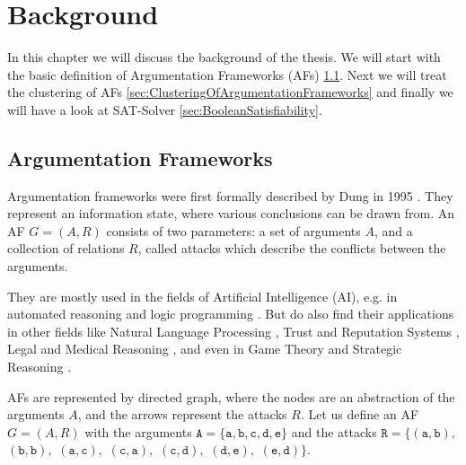 \chapter{Background}
In this chapter we will discuss the background of the thesis. We will start with the basic definition of Argumentation Frameworks (AFs) \ref{sec:ArgumentationFrameworks}. Next we will treat the clustering of AFs \ref{sec:ClusteringOfArgumentationFrameworks} and finally we will have a look at SAT-Solver \ref{sec:BooleanSatisfiability}.


\section{Argumentation Frameworks}
\label{sec:ArgumentationFrameworks}

Argumentation frameworks were first formally described by Dung in 1995 \cite{DUNG1995321}. They represent an information state, where various conclusions can be drawn from. An AF $G = (A, R)$ consists of two parameters: a set of arguments $A$, and a collection of relations $R$, called attacks which describe the conflicts between the arguments.

They are mostly used in the fields of Artificial Intelligence (AI), e.g. in automated reasoning and logic programming \cite{AFINAIARLP, AFINAIARLPexample}. But do also find their applications in other fields like Natural Language Processing \cite{AFINNLP}, Trust and Reputation Systems \cite{AFINTaRS}, Legal and Medical Reasoning \cite{legalAndMedicalReasoning}, and even in Game Theory and Strategic Reasoning \cite{AFinGames}.

AFs are represented by directed graph, where the nodes are an abstraction of the arguments $A$, and the arrows represent the attacks $R$. Let us define an AF $G = (A, R)$ with the arguments
$\mathtt{A=\{a, b, c, d, e\}}$ and the attacks
$\mathtt{R=\{(a,b),}$
$\mathtt{(b,b),}$
$\mathtt{(a,c),}$
$\mathtt{(c,a),}$
$\mathtt{(c,d),}$
$\mathtt{(d,e),}$
$\mathtt{(e,d)\}}.$


